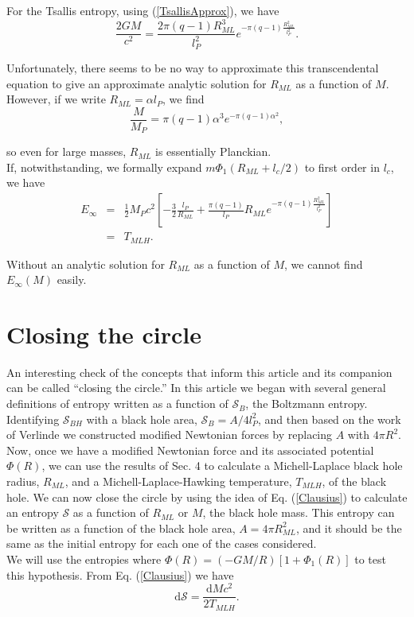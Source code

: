 \documentclass[nofootinbib,aps,prd,preprint,groupedaddress,showpacs,showkeys]{revtex4-1}
\newcommand{\dif}{\mathrm{d}}
\begin{document}
\indent For the Tsallis entropy, using (\ref{TsallisApprox}), we have
\begin{equation}
\frac{2GM}{c^2} = \frac{2\pi (q-1) R_{ML}^3}{l_P^2} e^{-\pi (q-1)\frac{R_{ML}^2}{l_P^2}}.
\end{equation}

\noindent Unfortunately, there seems to be no way to approximate this transcendental equation to give an approximate analytic solution for $R_{ML}$ as a function of $M$. However, if we write $R_{ML} = \alpha l_P$, we find
\begin{equation}
\frac{M}{M_P} = \pi (q-1) \alpha^3 e^{-\pi (q-1) \alpha^2},
\end{equation}

\noindent so even for large masses, $R_{ML}$ is essentially Planckian.\\
\indent If, notwithstanding, we formally expand $m \Phi_1 (R_{ML} + l_c/2)$ to first order in $l_c$, we have
\begin{eqnarray}
E_{\infty} &=& \frac{1}{2} M_P c^2 \left[-\frac{3}{2} \frac{l_P}{R_{ML}} + \frac{\pi (q-1)}{l_P} R_{ML} e^{-\pi (q-1) \frac{R_{ML}^2}{l_P^2}} \right] \nonumber \\
&=& T_{MLH}.
\end{eqnarray}

\noindent Without an analytic solution for $R_{ML}$ as a function of $M$, we cannot find $E_{\infty}(M)$ easily.

\section{Closing the circle}

\noindent An interesting check of the concepts that inform this article and its companion \cite{MOR} can be called ``closing the circle.'' In this article we began with several general definitions of entropy written as a function of $\mathcal{S}_B$, the Boltzmann entropy. Identifying $\mathcal{S}_{BH}$ with a black hole area, $\mathcal{S}_B = A/4l_P^2$, and then based on the work of Verlinde we constructed modified Newtonian forces by replacing $A$ with $4\pi R^2$.\\
\indent Now, once we have a modified Newtonian force and its associated potential $\Phi (R)$, we can use the results of Sec. 4 to calculate a Michell-Laplace black hole radius, $R_{ML}$, and a Michell-Laplace-Hawking temperature, $T_{MLH}$, of the black hole. We can now close the circle by using the idea of Eq. (\ref{Clausius}) to calculate an entropy $\mathcal{S}$ as a function of $R_{ML}$ or $M$, the black hole mass. This entropy can be written as a function of the black hole area, $A = 4\pi R_{ML}^2$, and it should be the same as the initial entropy for each one of the cases considered.\\
\indent We will use the entropies where $\Phi(R) = (-GM/R)[1 + \Phi_1(R)]$ to test this hypothesis. From Eq. (\ref{Clausius}) we have
\begin{equation}
\dif \mathcal{S} = \frac{\dif M c^2}{2T_{MLH}}.
\end{equation}
\end{document}
